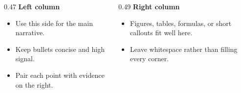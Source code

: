 \begin{frame}[plain]

  \vspace{14mm}
  \begin{columns}[T,onlytextwidth]
    \begin{column}{0.47\textwidth}
      {\small \textbf{Left column}}\par
      \vspace{2mm}
      \begin{itemize}
        \tightlist
        \item Use this side for the main narrative.
        \item Keep bullets concise and high signal.
        \item Pair each point with evidence on the right.
      \end{itemize}
    \end{column}
    \begin{column}{0.49\textwidth}
      {\small \textbf{Right column}}\par
      \vspace{2mm}
      \begin{itemize}
        \tightlist
        \item Figures, tables, formulas, or short callouts fit well here.
        \item Leave whitespace rather than filling every corner.
      \end{itemize}
    \end{column}
  \end{columns}

  \slideheaderfooter
\end{frame}
